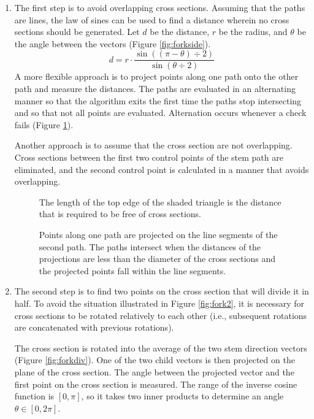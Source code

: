\documentclass[10pt]{article}
\begin{document}
\begin{enumerate}
\item The first step is to avoid overlapping cross sections. Assuming that the paths are lines, the law of sines can be used to find a distance wherein no cross sections should be generated. Let $ d $ be the distance, $ r $ be the radius, and $ \theta $ be the angle between the vectors (Figure \ref{fig:forkside}).
\[ d = r \cdot \frac{\sin((\pi-\theta)\div2)}{\sin (\theta\div2)} \]
A more flexible approach is to project points along one path onto the other path and measure the distances. The paths are evaluated in an alternating manner so that the algorithm exits the first time the paths stop intersecting and so that not all points are evaluated. Alternation occurs whenever a check fails (Figure \ref{fig:path}).

Another approach is to assume that the cross section are not overlapping. Cross sections between the first two control points of the stem path are eliminated, and the second control point is calculated in a manner that avoids overlapping.

\begin{figure}[H]
 \begin{minipage}[H]{0.46\textwidth}
  \centering
  
  \caption{The length of the top edge of the shaded triangle is the distance that is required to be free of cross sections.} \label{fig:forkside}
 \end{minipage}
 \hfill
 \begin{minipage}[H]{0.46\textwidth}
  \centering
  
  \caption{Points along one path are projected on the line segments of the second path. The paths intersect when the distances of the projections are less than the diameter of the cross sections and the projected points fall within the line segments.} \label{fig:path}
 \end{minipage}
\end{figure}

\item The second step is to find two points on the cross section that will divide it in half. To avoid the situation illustrated in Figure \ref{fig:fork2}, it is necessary for cross sections to be rotated relatively to each other (i.e., subsequent rotations are concatenated with previous rotations).

The cross section is rotated into the average of the two stem direction vectors (Figure \ref{fig:forkdiv}). One of the two child vectors is then projected on the plane of the cross section. The angle between the projected vector and the first point on the cross section is measured. The range of the inverse cosine function is $ [0, \pi] $, so it takes two inner products to determine an angle $ \theta \in [0, 2\pi] $.


\end{enumerate}
\end{document}
